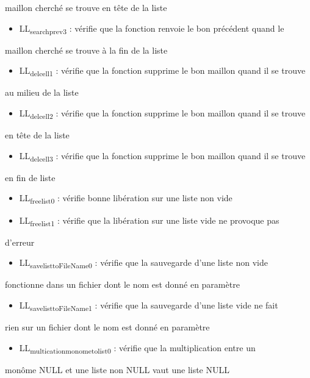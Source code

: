 \documentclass[11pt]{article}
\begin{document}
maillon cherché se trouve en tête de la liste
\begin{itemize}
\item LL\textsubscript{search}\textsubscript{prev3} : vérifie que la fonction renvoie le bon précédent quand le
\end{itemize}
maillon cherché se trouve à la fin de la liste
\begin{itemize}
\item LL\textsubscript{del}\textsubscript{cell1} : vérifie que la fonction supprime le bon maillon quand il se trouve
\end{itemize}
au milieu de la liste
\begin{itemize}
\item LL\textsubscript{del}\textsubscript{cell2} : vérifie que la fonction supprime le bon maillon quand il se trouve
\end{itemize}
en tête de la liste
\begin{itemize}
\item LL\textsubscript{del}\textsubscript{cell3} : vérifie que la fonction supprime le bon maillon quand il se trouve
\end{itemize}
en fin de liste
\begin{itemize}
\item LL\textsubscript{free}\textsubscript{list0} : vérifie bonne libération sur une liste non vide
\item LL\textsubscript{free}\textsubscript{list1} : vérifie que la libération sur une liste vide ne provoque pas
\end{itemize}
d'erreur
\begin{itemize}
\item LL\textsubscript{save}\textsubscript{list}\textsubscript{toFileName0} : vérifie que la sauvegarde d'une liste non vide
\end{itemize}
fonctionne dans un fichier dont le nom est donné en paramètre
\begin{itemize}
\item LL\textsubscript{save}\textsubscript{list}\textsubscript{toFileName1} : vérifie que la sauvegarde d'une liste vide ne fait
\end{itemize}
rien sur un fichier dont le nom est donné en paramètre
\begin{itemize}
\item LL\textsubscript{multication}\textsubscript{monome}\textsubscript{to}\textsubscript{list0} : vérifie que la multiplication entre un
\end{itemize}
monôme NULL et une liste non NULL vaut une liste NULL
\end{document}
